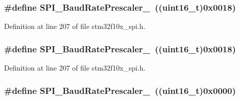 \subsubsection[{\texorpdfstring{S\+P\+I\+\_\+\+Baud\+Rate\+Prescaler\+\_\+16}{SPI_BaudRatePrescaler_16}}]{\setlength{\rightskip}{0pt plus 5cm}\#define S\+P\+I\+\_\+\+Baud\+Rate\+Prescaler\+\_~(({\bf uint16\+\_\+t})0x0018)}\hypertarget{group___s_p_i___baud_rate___prescaler_ga5ef8587bb96e3ec98e9fde770756fc7d}{}\label{group___s_p_i___baud_rate___prescaler_ga5ef8587bb96e3ec98e9fde770756fc7d}


Definition at line 207 of file stm32f10x\+\_\+spi.\+h.

\subsubsection[{\texorpdfstring{S\+P\+I\+\_\+\+Baud\+Rate\+Prescaler\+\_\+16}{SPI_BaudRatePrescaler_16}}]{\setlength{\rightskip}{0pt plus 5cm}\#define S\+P\+I\+\_\+\+Baud\+Rate\+Prescaler\+\_~(({\bf uint16\+\_\+t})0x0018)}\hypertarget{group___s_p_i___baud_rate___prescaler_ga5ef8587bb96e3ec98e9fde770756fc7d}{}\label{group___s_p_i___baud_rate___prescaler_ga5ef8587bb96e3ec98e9fde770756fc7d}


Definition at line 207 of file stm32f10x\+\_\+spi.\+h.

\subsubsection[{\texorpdfstring{S\+P\+I\+\_\+\+Baud\+Rate\+Prescaler\+\_\+2}{SPI_BaudRatePrescaler_2}}]{\setlength{\rightskip}{0pt plus 5cm}\#define S\+P\+I\+\_\+\+Baud\+Rate\+Prescaler\+\_~(({\bf uint16\+\_\+t})0x0000)}\hypertarget{group___s_p_i___baud_rate___prescaler_ga88cd6d416c87b382396dbf4c02e3bd4b}{}\label{group___s_p_i___baud_rate___prescaler_ga88cd6d416c87b382396dbf4c02e3bd4b}


